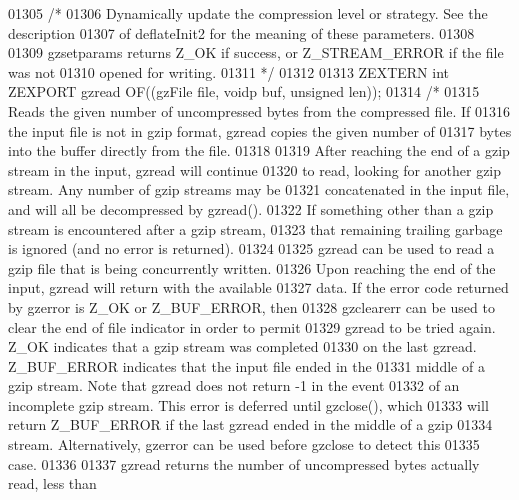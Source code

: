 \begin{DoxyCode}
01305 \textcolor{comment}{/*}
01306 \textcolor{comment}{     Dynamically update the compression level or strategy.  See the description}
01307 \textcolor{comment}{   of deflateInit2 for the meaning of these parameters.}
01308 \textcolor{comment}{}
01309 \textcolor{comment}{     gzsetparams returns Z\_OK if success, or Z\_STREAM\_ERROR if the file was not}
01310 \textcolor{comment}{   opened for writing.}
01311 \textcolor{comment}{*/}
01312 
01313 ZEXTERN \textcolor{keywordtype}{int} ZEXPORT gzread OF((gzFile file, voidp buf, \textcolor{keywordtype}{unsigned} len));
01314 \textcolor{comment}{/*}
01315 \textcolor{comment}{     Reads the given number of uncompressed bytes from the compressed file.  If}
01316 \textcolor{comment}{   the input file is not in gzip format, gzread copies the given number of}
01317 \textcolor{comment}{   bytes into the buffer directly from the file.}
01318 \textcolor{comment}{}
01319 \textcolor{comment}{     After reaching the end of a gzip stream in the input, gzread will continue}
01320 \textcolor{comment}{   to read, looking for another gzip stream.  Any number of gzip streams may be}
01321 \textcolor{comment}{   concatenated in the input file, and will all be decompressed by gzread().}
01322 \textcolor{comment}{   If something other than a gzip stream is encountered after a gzip stream,}
01323 \textcolor{comment}{   that remaining trailing garbage is ignored (and no error is returned).}
01324 \textcolor{comment}{}
01325 \textcolor{comment}{     gzread can be used to read a gzip file that is being concurrently written.}
01326 \textcolor{comment}{   Upon reaching the end of the input, gzread will return with the available}
01327 \textcolor{comment}{   data.  If the error code returned by gzerror is Z\_OK or Z\_BUF\_ERROR, then}
01328 \textcolor{comment}{   gzclearerr can be used to clear the end of file indicator in order to permit}
01329 \textcolor{comment}{   gzread to be tried again.  Z\_OK indicates that a gzip stream was completed}
01330 \textcolor{comment}{   on the last gzread.  Z\_BUF\_ERROR indicates that the input file ended in the}
01331 \textcolor{comment}{   middle of a gzip stream.  Note that gzread does not return -1 in the event}
01332 \textcolor{comment}{   of an incomplete gzip stream.  This error is deferred until gzclose(), which}
01333 \textcolor{comment}{   will return Z\_BUF\_ERROR if the last gzread ended in the middle of a gzip}
01334 \textcolor{comment}{   stream.  Alternatively, gzerror can be used before gzclose to detect this}
01335 \textcolor{comment}{   case.}
01336 \textcolor{comment}{}
01337 \textcolor{comment}{     gzread returns the number of uncompressed bytes actually read, less than}

\end{DoxyCode}
